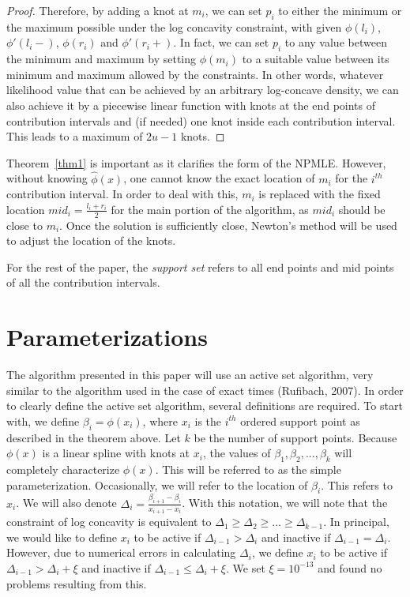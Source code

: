 \documentclass[12pt]{article}
\numberwithin{equation}{section}
\begin{document}
\begin{proof}
	Therefore, by adding a knot at $m_i$, we can set $p_i$ to either the minimum or the maximum possible under the log concavity constraint, with given $\phi(l_i)$, $\phi'(l_i -)$, $\phi(r_i)$ and $\phi'(r_i+)$. In fact, we can set $p_i$ to any value between the minimum and maximum by setting $\phi(m_i)$ to a suitable value between its minimum and maximum allowed by the constraints.  In other words, whatever likelihood value that can be achieved by an arbitrary log-concave density, we can also achieve it by a piecewise linear function with knots at the end points of contribution intervals and (if needed) one knot inside each contribution interval. This leads to a maximum of $2u-1$ knots.
	\end{proof}
	
	Theorem~\ref{thm1} is important as it clarifies the form of the NPMLE.  However, without knowing $\hat\phi(x)$, one cannot know the exact location of $m_i$ for the $i^{th}$ contribution interval. In order to deal with this, $m_i$ is replaced with the fixed location $mid_i = \frac{l_i + r_i}{2}$ for the main portion of the algorithm, as $mid_i$ should be close to $m_i$. Once the solution is sufficiently close, Newton's method will be used to adjust the location of the knots. 
		
	For the rest of the paper, the {\it support set} refers to all end points and mid points of all the contribution intervals.

	{\section{Parameterizations} }
	
	The algorithm presented in this paper will use an active set algorithm, very similar to the algorithm used in the case of exact times (Rufibach, 2007). In order to clearly define the active set algorithm, several definitions are required. To start with, we define $\beta_i = \phi(x_i)$, where $x_i$ is the $i^{th}$ ordered support point as described in the theorem above. Let $k$ be the number of support points. Because $\phi(x)$ is a linear spline with knots at $x_i$, the values of $\beta_1, \beta_2, ..., \beta_k$ will completely characterize $\phi(x)$. This will be referred to as the simple parameterization. Occasionally, we will refer to the location of $\beta_i$. This refers to $x_i$. We will also denote $\Delta_i = \frac{\beta_{i+1} - \beta_i} {x_{i+1} - x_i}$. With this notation, we will note that the constraint of log concavity is equivalent to $\Delta_1 \geq \Delta_2 \geq ... \geq \Delta_{k-1}$. In principal, we would like to define $x_i$ to be active if $\Delta_{i-1} > \Delta_i$ and inactive if $\Delta_{i-1} = \Delta_i$. However, due to numerical errors in calculating $\Delta_i$, we define $x_i$ to be active if $\Delta_{i-1} > \Delta_i + \xi$ and inactive if $\Delta_{i-1} \leq \Delta_i + \xi$.  We set $\xi = 10^{-13}$ and found no problems resulting from this. 
	
\end{document}
